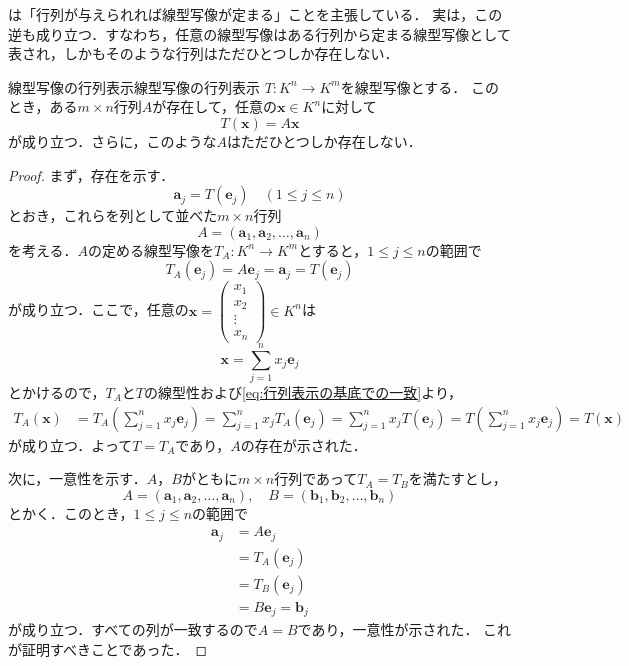 は「行列が与えられれば線型写像が定まる」ことを主張している．
実は，この逆も成り立つ．すなわち，任意の線型写像はある行列から定まる線型写像として表され，しかもそのような行列はただひとつしか存在しない．

\begin{theorem}{線型写像の行列表示}{線型写像の行列表示}
  $T \colon K^n \to K^m$を線型写像とする．
  このとき，ある$m \times n$行列$A$が存在して，任意の$\bm{x} \in K^n$に対して
  \[
    T(\bm{x}) = A\bm{x}
  \]
  が成り立つ．さらに，このような$A$はただひとつしか存在しない．
\end{theorem}

\begin{leftbar}
\begin{proof}
  まず，存在を示す．
  \[
    \bm{a}_j = T(\bm{e}_j) \quad (1 \le j \le n)
  \]
  とおき，これらを列として並べた$m \times n$行列
  \[
    A = (\bm{a}_1, \bm{a}_2, \dots, \bm{a}_n)
  \]
  を考える．$A$の定める線型写像を$T_A \colon K^n \to K^m$とすると，$1 \le j \le n$の範囲で
  \begin{equation}
    T_A(\bm{e}_j) = A\bm{e}_j = \bm{a}_j = T(\bm{e}_j) \label{eq:行列表示の基底での一致}
  \end{equation}
  が成り立つ．ここで，任意の$\bm{x} = \begin{pmatrix} x_1 \\ x_2 \\ \vdots \\ x_n \end{pmatrix} \in K^n$は
  \[
    \bm{x} = \sum_{j=1}^{n} x_j \bm{e}_j
  \]
  とかけるので，$T_A$と$T$の線型性および\eqref{eq:行列表示の基底での一致}より，
  \begin{align*}
    T_A(\bm{x}) &= T_A\left(\sum_{j=1}^{n} x_j \bm{e}_j\right)
    = \sum_{j=1}^{n} x_j T_A(\bm{e}_j)
    = \sum_{j=1}^{n} x_j T(\bm{e}_j)
    = T\left(\sum_{j=1}^{n} x_j \bm{e}_j\right)
    = T(\bm{x})
  \end{align*}
  が成り立つ．よって$T = T_A$であり，$A$の存在が示された．

  次に，一意性を示す．$A$，$B$がともに$m \times n$行列であって$T_A = T_B$を満たすとし，
  \[
    A = (\bm{a}_1, \bm{a}_2, \dots, \bm{a}_n), \quad
    B = (\bm{b}_1, \bm{b}_2, \dots, \bm{b}_n)
  \]
  とかく．このとき，$1 \le j \le n$の範囲で
  \begin{align}
    \bm{a}_j &= A\bm{e}_j \nonumber \\
    &= T_A(\bm{e}_j) \tag{$T_A$の定義} \\
    &= T_B(\bm{e}_j) \tag{$T_A = T_B$} \\
    &= B\bm{e}_j = \bm{b}_j \nonumber
  \end{align}
  が成り立つ．すべての列が一致するので$A = B$であり，一意性が示された．
  これが証明すべきことであった．
\end{proof}
\end{leftbar}

